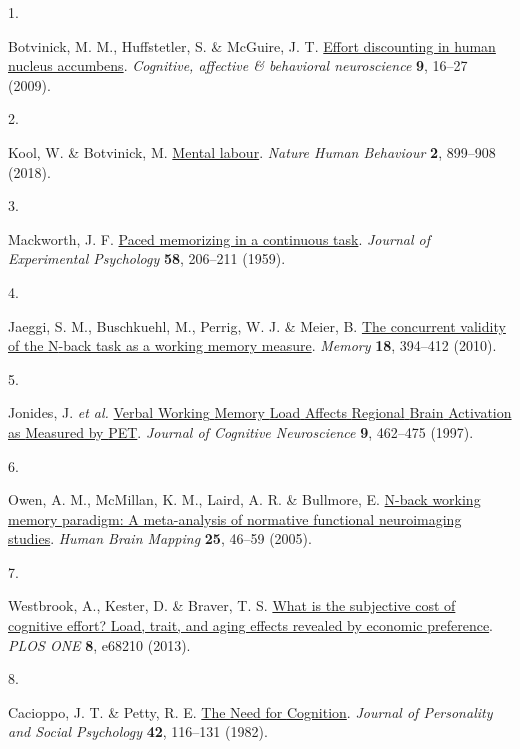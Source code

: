 \documentclass[
  man,floatsintext]{apa6}
\newlength{\cslhangindent}
\newlength{\csllabelwidth}
\newlength{\cslentryspacingunit} %
\newenvironment{CSLReferences}[2] %
 {%
  \setlength{\parindent}{0pt}
  \ifodd #1
  \let\oldpar\par
  \def\par{\hangindent=\cslhangindent\oldpar}
  \fi
  \setlength{\parskip}{#2\cslentryspacingunit}
 }%
 {}
\newcommand{\CSLLeftMargin}[1]{\parbox[t]{\csllabelwidth}{#1}}
\newcommand{\CSLRightInline}[1]{\parbox[t]{\linewidth - \csllabelwidth}{#1}\break}
\begin{document}
\hypertarget{refs}{}
\begin{CSLReferences}{0}{0}
\leavevmode{}%
\CSLLeftMargin{1. }%
\CSLRightInline{Botvinick, M. M., Huffstetler, S. \& McGuire, J. T. \href{https://doi.org/10.3758/CABN.9.1.16}{Effort discounting in human nucleus accumbens}. \emph{Cognitive, affective \& behavioral neuroscience} \textbf{9}, 16--27 (2009).}

\leavevmode{}%
\CSLLeftMargin{2. }%
\CSLRightInline{Kool, W. \& Botvinick, M. \href{https://doi.org/10.1038/s41562-018-0401-9}{Mental labour}. \emph{Nature Human Behaviour} \textbf{2}, 899--908 (2018).}

\leavevmode{}%
\CSLLeftMargin{3. }%
\CSLRightInline{Mackworth, J. F. \href{https://doi.org/10.1037/h0049090}{Paced memorizing in a continuous task}. \emph{Journal of Experimental Psychology} \textbf{58}, 206--211 (1959).}

\leavevmode{}%
\CSLLeftMargin{4. }%
\CSLRightInline{Jaeggi, S. M., Buschkuehl, M., Perrig, W. J. \& Meier, B. \href{https://doi.org/10.1080/09658211003702171}{The concurrent validity of the {N}-back task as a working memory measure}. \emph{Memory} \textbf{18}, 394--412 (2010).}

\leavevmode{}%
\CSLLeftMargin{5. }%
\CSLRightInline{Jonides, J. \emph{et al.} \href{https://doi.org/10.1162/jocn.1997.9.4.462}{Verbal {Working} {Memory} {Load} {Affects} {Regional} {Brain} {Activation} as {Measured} by {PET}}. \emph{Journal of Cognitive Neuroscience} \textbf{9}, 462--475 (1997).}

\leavevmode{}%
\CSLLeftMargin{6. }%
\CSLRightInline{Owen, A. M., McMillan, K. M., Laird, A. R. \& Bullmore, E. \href{https://doi.org/10.1002/hbm.20131}{N-back working memory paradigm: A meta-analysis of normative functional neuroimaging studies}. \emph{Human Brain Mapping} \textbf{25}, 46--59 (2005).}

\leavevmode{}%
\CSLLeftMargin{7. }%
\CSLRightInline{Westbrook, A., Kester, D. \& Braver, T. S. \href{https://doi.org/10.1371/journal.pone.0068210}{What is the subjective cost of cognitive effort? {Load}, trait, and aging effects revealed by economic preference}. \emph{PLOS ONE} \textbf{8}, e68210 (2013).}

\leavevmode{}%
\CSLLeftMargin{8. }%
\CSLRightInline{Cacioppo, J. T. \& Petty, R. E. \href{https://doi.org/10.1037//0022-3514.42.1.116}{The {Need} for {Cognition}}. \emph{Journal of Personality and Social Psychology} \textbf{42}, 116--131 (1982).}


\end{CSLReferences}
\end{document}
